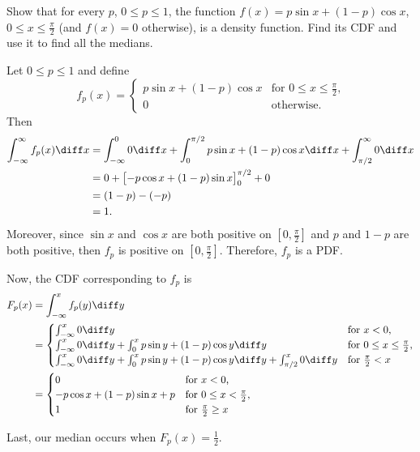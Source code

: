 \begin{problem}[Handout 12, \# 16]
  Show that for every \(p\), \(0\leq p\leq 1\), the function
  \(f(x)=p\sin x+(1-p)\cos x\), \(0\leq x\leq\frac{\pi}{2}\) (and
  \(f(x)=0\) otherwise), is a density function. Find its CDF and use it to
  find all the medians.
\end{problem}
\begin{solution}
  Let \(0\leq p\leq 1\) and define
  \[
    f_p(x)=
    \begin{cases}
      p\sin x+(1-p)\cos x&\text{for \(0\leq x\leq\frac{\pi}{2}\),}\\
      0&\text{otherwise.}
    \end{cases}
  \]
  Then
  \begin{align*}
    \int_{-\infty}^\infty f_p(x)\diff x
    &=\int_{-\infty}^0 0\diff x%
      +\int_0^{\pi/2} p \sin x + (1-p) \cos x \diff x%
      +\int_{\pi/2}^\infty 0\diff x\\
    &=0%
      +\bigl[-p\cos x+(1-p)\sin x\bigr]_0^{\pi/2}%
      +0\\
    &=(1-p)-(-p)\\
    &=1.
  \end{align*}
  Moreover, since $\sin x$ and $\cos x$ are both positive on
  $[0,\frac{\pi}{2}]$ and $p$ and $1-p$ are both positive, then $f_p$ is
  positive on $[0,\frac{\pi}{2}]$. Therefore, $f_p$ is a PDF.

  Now, the CDF corresponding to $f_p$ is
  \begin{align*}
    F_p(x)
    &=\int_{-\infty}^x f_p(y) \diff y \\
    &=\begin{cases}
      \int_{-\infty}^x 0 \diff y &\text{for \(x<0\),}\\
      \int_{-\infty}^x 0 \diff y%
      +\int_0^x p\sin y+(1-p)\cos y\diff y&\text{for \(0\leq x\leq\frac{\pi}{2}\),}\\
      \int_{-\infty}^x 0 \diff y%
      +\int_0^x p\sin y+(1-p)\cos y\diff y%
      +\int_{\pi/2}^x 0 \diff y%
      &\text{for \(\frac{\pi}{2}<x\)}
    \end{cases}\\
    &=\begin{cases}
      0&\text{for \(x<0\),}\\
      -p\cos x+(1-p)\sin x+p&\text{for \(0\leq x<\frac{\pi}{2}\),}\\
      1&\text{for \(\frac{\pi}{2}\geq x\)}
      \end{cases}
  \end{align*}

  Last, our median occurs when $F_p(x) = \frac{1}{2}$.
\end{solution}
\newpage


